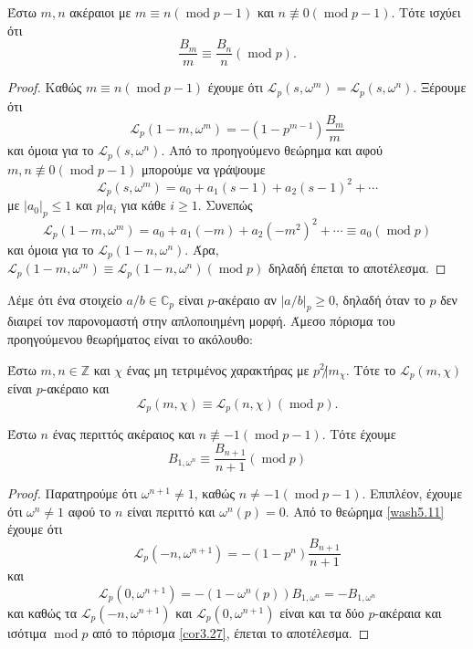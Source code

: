 \begin{cor}
	Έστω $m,n$ ακέραιοι με $m\equiv n(\operatorname{mod}p-1)$ και $n\not\equiv 0(\operatorname{mod}p-1)$. Τότε ισχύει ότι
	$$\frac{B_m}{m} \equiv \frac{B_n}{n}(\operatorname{mod}p).$$
\end{cor}

\begin{proof} Καθώς $m\equiv n (\operatorname{mod}p-1)$ έχουμε ότι $\mathcal{L}_p(s,\omega^m)=\mathcal{L}_p (s,\omega^n)$. Ξέρουμε ότι
	$$\mathcal{L}_p (1-m,\omega^m) = -(1-p^{m-1})\frac{B_m}{m}$$ και όμοια για το $\mathcal{L}_p(s,\omega^n)$. Από το προηγούμενο θεώρημα και αφού $m,n\not\equiv 0 (\operatorname{mod}p-1)$ μπορούμε να γράψουμε
	$$\mathcal{L}_p(s,\omega^m) = a_0 + a_1(s-1)+a_2(s-1)^2 + \cdots$$ με $|a_0|_p\leq 1$ και $p|a_i$ για κάθε $i\geq 1$. Συνεπώς
	$$\mathcal{L}_p(1-m,\omega^m) = a_0 + a_1(-m) + a_2(-m^2)^2 + \cdots \equiv a_0 (\operatorname{mod}p)$$ και όμοια για το 
	$\mathcal{L}_p(1-n,\omega^n)$. Άρα, $\mathcal{L}_p(1-m,\omega^m) \equiv \mathcal{L}_p(1-n,\omega^n)(\operatorname{mod}p)$ δηλαδή έπεται το αποτέλεσμα.
\end{proof}


\noindent Λέμε ότι ένα στοιχείο $a/b \in \mathbb{C}_p$ είναι $p$-ακέραιο αν $|a/b|_p \geq 0$, δηλαδή όταν το $p$ δεν διαιρεί τον παρονομαστή 
στην απλοποιημένη μορφή. Άμεσο πόρισμα του προηγούμενου θεωρήματος είναι το ακόλουθο:

\begin{cor}\label{cor3.27}
	Έστω $m,n \in \mathbb{Z}$ και $\chi$ ένας μη τετριμένος χαρακτήρας με $p^2 \not| m_{\chi}$. Τότε το $\mathcal{L}_p (m,\chi)$ είναι $p$-ακέραιο και 
	$$\mathcal{L}_p(m,\chi) \equiv \mathcal{L}_p(n,\chi)(\operatorname{mod}p).$$
\end{cor}


\begin{cor}
Έστω $n$ ένας περιττός ακέραιος και $n\not\equiv -1 (\operatorname{mod}p-1)$. Τότε έχουμε
$$B_{1,\omega^n} \equiv \frac{B_{n+1}}{n+1}(\operatorname{mod}p)$$
\end{cor}


\begin{proof}
	Παρατηρούμε ότι $\omega^{n+1}\neq 1$, καθώς $n\neq -1 (\operatorname{mod}p-1)$. Επιπλέον, έχουμε ότι $\omega^n \neq 1$ 
	αφού το $n$ είναι περιττό και $\omega^n(p) = 0$. Από το θεώρημα \ref{wash5.11} έχουμε ότι
	$$\mathcal{L}_p(-n,\omega^{n+1}) = -(1-p^n)\frac{B_{n+1}}{n+1}$$ και 
	$$\mathcal{L}_p(0,\omega^{n+1}) = -(1-\omega^n(p))B_{1,\omega^n} = -B_{1,\omega^n}$$
	και καθώς τα $\mathcal{L}_p(-n,\omega^{n+1})$ και $\mathcal{L}_p(0,\omega^{n+1})$ είναι και τα δύο $p$-ακέραια 
	και ισότιμα $\operatorname{mod}p$ από το πόρισμα \ref{cor3.27}, έπεται το αποτέλεσμα.
\end{proof}


